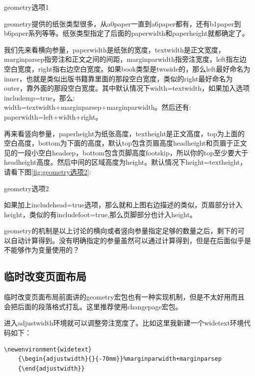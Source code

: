 \documentclass[11pt,oneside]{book}
\begin{document}
\begin{common-format}
\begin{linefig}{geometry选项1}   %
	\label{fig:geometry选项1}
\end{linefig}

geometry提供的纸张类型很多，从a0paper一直到a6paper都有，还有b1paper到b6paper系列等等。纸张类型指定了后面的paperwidth和paperheight就都确定了。

我们先来看横向参量，paperwidth是纸张的宽度，textwidth是正文宽度，marginparsep指旁注和正文之间的间距，marginparwidth指旁注宽度，left指左边空白宽度，right指右边空白宽度。如果book类型是twoside的，那么left最好命名为inner，也就是类似出版书籍靠里面的那段空白宽度，类似的right最好命名为outer，靠外面的那段空白宽度。其中默认情况下width=textwidth，如果加入选项\\includemp=true，那么:\\width=textwidth+marginparsep+marginparwidth。然后还有:\\paperwidth=left+width+right。

再来看竖向参量，paperheight为纸张高度，textheight是正文高度，top为上面的空白高度，bottom为下面的高度，默认top包含页眉高度headheight和页眉于正文见的一段小空白headsep，bottom包含页脚高度footskip，所以你的top至少要大于headheight高度。然后中间的区域高度为height。默认情况下height=textheight，请看下图\ref{fig:geometry选项2}:

\begin{linefig}{geometry选项2}  
	\label{fig:geometry选项2}
\end{linefig}

如果加上includehead=true选项，那么就和上图右边描述的类似，页眉部分计入height，类似的有includefoot=true,那么页脚部分也计入height。

geometry的机制是以上讨论的横向或者竖向参量指定足够的数量之后，剩下的可以自动计算得到。没有明确指定的参量虽然可以通过计算得到，但是在后面似乎是不能够作为变量使用的？


\subsection{临时改变页面布局}
临时改变页面布局前面讲的geometry宏包也有一种实现机制，但是不太好用而且会把后面的段落格式打乱。这里推荐使用changepage宏包。

进入adjustwidth环境就可以调整旁注宽度了。比如这里我新建一个widetext环境代码如下：

\begin{Verbatim}
\newenvironment{widetext}  
	{\begin{adjustwidth}{}{-70mm}}%marginparwidth+marginparsep
	{\end{adjustwidth}}
\end{Verbatim}  


\end{common-format}
\end{document}
